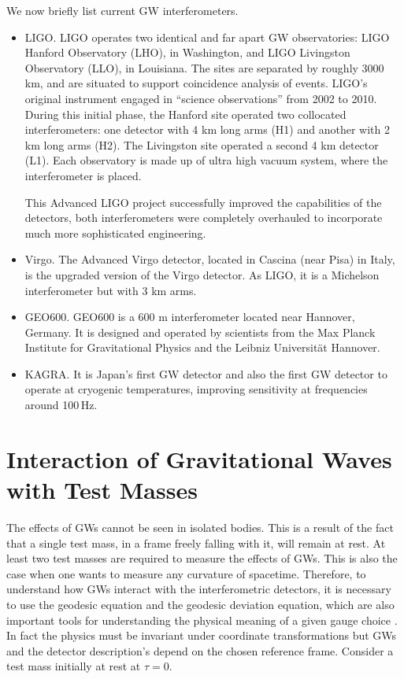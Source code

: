 \documentclass[binding=0.6cm, LaM]{sapthesis}
\begin{document}
	We now briefly list current GW interferometers.
	\begin{itemize}
        \item LIGO. LIGO operates two identical and far apart GW observatories: 
          LIGO Hanford Observatory (LHO), in Washington, and LIGO Livingston Observatory (LLO), in Louisiana.
          The sites are separated by roughly 3000 km, 
          and are situated to support coincidence analysis of events.
          LIGO's original instrument engaged in ``science observations'' from 2002 to 2010. 
          During this initial phase, the Hanford site operated two collocated interferometers:
          one detector with 4 km long arms (H1) and another with 2 km long arms (H2). 
          The Livingston site operated a second 4 km detector (L1). 
          Each observatory is made up of ultra high vacuum system, 
          where the interferometer is placed.

          This Advanced LIGO project successfully improved the capabilities of the detectors, 
          both interferometers were completely overhauled to incorporate much more sophisticated engineering.
        \item Virgo. The Advanced Virgo detector, located in Cascina (near Pisa) in Italy, 
          is the upgraded version of the Virgo detector. 
          As LIGO, it is a Michelson interferometer but with 3 km arms.
        \item GEO600. GEO600 is a 600 m interferometer located near Hannover,
          Germany. It is designed and operated by scientists from the
          Max Planck Institute for Gravitational Physics and the Leibniz Universit\"at Hannover.
        \item KAGRA. It is Japan’s first GW detector and also the first GW detector to operate
          at cryogenic temperatures, improving sensitivity at frequencies around 100\,Hz.
        \end{itemize}

\section{Interaction of Gravitational Waves with Test Masses}
	The effects of GWs cannot be seen in isolated bodies. 
	This is a result of the fact that a single test mass, 
	in a frame freely falling with it, will remain at rest.
	At least two test masses are required to measure the effects of GWs. 	
	This is also the case when one wants to measure any curvature of spacetime.
        Therefore, to understand how GWs interact with the interferometric detectors,
        it is necessary to use the geodesic equation and the geodesic deviation equation, which are also important tools
        for understanding the physical meaning of a given gauge choice \cite{3}. 
        In fact the physics must be invariant under coordinate transformations but GWs and the detector description's depend on the chosen reference frame.
        Consider a test mass initially at rest at $\tau = 0$.
\end{document}
